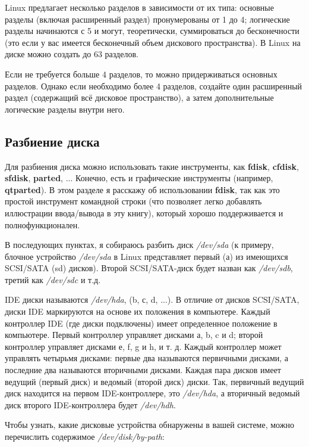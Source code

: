 \documentclass[10pt]{book}
\begin{document}
Linux предлагает несколько разделов в зависимости от их типа: основные разделы (включая расширенный раздел) пронумерованы от 1 до 4; логические разделы начинаются с 5 и могут, теоретически, суммироваться до бесконечности (это если у вас имеется бесконечный объем дискового пространства). В Linux на диске можно создать до 63 разделов.

Если не требуется больше 4 разделов, то можно придерживаться основных разделов. Однако если необходимо более 4 разделов, создайте один расширенный раздел (содержащий всё дисковое пространство), а затем дополнительные логические разделы внутри него.

\subsection{Разбиение диска}
Для разбиения диска можно использовать такие инструменты, как \textbf{fdisk}, \textbf{cfdisk}, \textbf{sfdisk}, \textbf{parted}, ... Конечно, есть и графические инструменты (например, \textbf{qtparted}). В этом разделе я расскажу об использовании \textbf{fdisk}, так как это простой инструмент командной строки (что позволяет легко добавлять иллюстрации ввода/вывода в эту книгу), который хорошо поддерживается и полнофункционален.

В последующих пунктах, я собираюсь разбить диск \textit{/dev/sda} (к примеру, блочное устройство \textit{/dev/sda} в Linux представляет первый (а) из имеющихся SCSI/SATA (sd) дисков). Второй SCSI/SATA-диск будет назван как \textit{/dev/sdb}, третий как \textit{/dev/sdc} и т.д.

IDE диски называются \textit{/dev/hda}, (b, с, d, ...). В отличие от дисков SCSI/SATA, диски IDE маркируются на основе их положения в компьютере. Каждый контроллер IDE (где диски подключены) имеет определенное положение в компьютере. Первый контроллер управляет дисками а, b, c и d; второй контроллер управляет дисками е, f, g и h, и т. д. Каждый контроллер может управлять четырьмя дисками: первые два называются первичными дисками, а последние два называются вторичными дисками. Каждая пара дисков имеет ведущий (первый диск) и ведомый (второй диск) диски. Так, первичный ведущий диск находится на первом IDE-контроллере, это \textit{/dev/hda}, а вторичный ведомый диск второго IDE-контроллера будет \textit{/dev/hdh}.

Чтобы узнать, какие дисковые устройства обнаружены в вашей системе, можно перечислить содержимое \textit{/dev/disk/by-path}:
\end{document}
